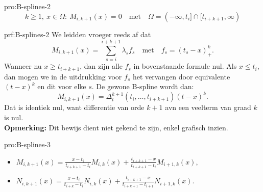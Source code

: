 \begin{pro}[B-spline]{pro:B-splines-2}
    \begin{equation*}
    k\geq 1,\ x \in \Omega:\ M_{i,k+1}(x) = 0 \quad \text{met} \quad \Omega = (-\infty, t_i] \cap [t_{i+k+1}, \infty)
    \end{equation*}
    \vspace{-.2cm}
\end{pro}

\begin{prf}[B-spline]{prf:B-splines-2}
    We leidden vroeger reeds af dat 
    \begin{equation*}
        M_{i,k+1}(x) = \sum_{s=i}^{i+k+1} \lambda_s f_s \quad \text{met} \quad f_s = (t_s - x)^k_+.
    \end{equation*}
    Wanneer nu $x \geq t_{i+k+1}$, dan zijn alle $f_s$ in bovenstaande formule nul. Als $x \leq t_i$, dan mogen we in de uitdrukking voor $f_s$ het vervangen door equivalente $(t-x)^k$ en dit voor elke $s$. De gewone B-spline wordt dan:
    \begin{equation*}
        M_{i,k+1}(x) = \Delta_t^{k+1} (t_i,\ldots,t_{i+k+1}) (t-x)^k.
    \end{equation*}
    Dat is identiek nul, want differentie van orde $k+1$ avn een veelterm van graad $k$ is nul. \\

    \textbf{Opmerking:}  Dit bewijs dient niet gekend te zijn, enkel grafisch inzien.
\end{prf}

\begin{pro}{pro:B-splines-3}
    \begin{itemize}
        \item $M_{i,k+1}(x) = \frac{x-t_i}{t_{i+k+1}-t_i} M_{i,k}(x) + \frac{t_{i+k+1}-x}{t_{i+k+1}-t_{i}} M_{i+1,k}(x)$,
        \item $N_{i,k+1}(x) = \frac{x-t_i}{t_{i+k}-t_i} N_{i,k}(x) + \frac{t_{i+k+1}-x}{t_{i+k+1}-t_{i+1}} N_{i+1,k}(x)$.
    \end{itemize}
\end{pro}


